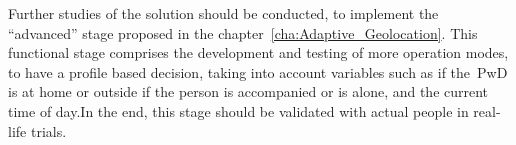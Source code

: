 Further studies of the solution should be conducted, to implement the “advanced” stage proposed in the chapter~\ref{cha:Adaptive_Geolocation}. This functional stage comprises the development and testing of more operation modes, to have a profile based decision, taking into account variables such as if the~\gls{PwD} is at home or outside if the person is accompanied or is alone, and the current time of day.\newline In the end, this stage should be validated with actual people in real-life trials.